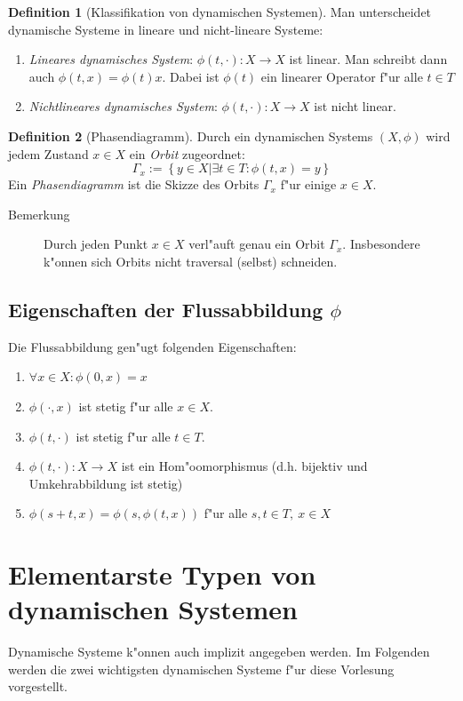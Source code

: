 \documentclass[a4paper, 13pt]{scrreprt}
\theoremstyle{definition} \newtheorem{definition}{Definition}[section]
\begin{document}
\begin{definition}[Klassifikation von dynamischen Systemen]
Man unterscheidet dynamische Systeme in lineare und nicht-lineare Systeme:
\begin{enumerate}
\item \emph{Lineares dynamisches System}: $\phi(t, \cdot)\colon X \to X$ ist linear. Man schreibt dann auch $\phi(t, x) = \phi(t)x$. Dabei ist $\phi(t)$ ein linearer Operator f"ur alle $t\in T$
\item \emph{Nichtlineares dynamisches System}: $\phi(t, \cdot)\colon X \to X$ ist nicht linear.
\end{enumerate}
\end{definition}
\begin{definition}[Phasendiagramm]
Durch ein dynamischen Systems $(X,\phi)$ wird jedem Zustand $x\in X$ ein \emph{Orbit} zugeordnet:
$$\Gamma_x := \left \{\left. y \in X \right | \exists t\in T: \phi(t,x) = y\right \}$$ 
Ein \emph{Phasendiagramm} ist die Skizze des Orbits $\Gamma_x$ f"ur einige $x \in X$.
\begin{description}
\item[Bemerkung]Durch jeden Punkt $x\in X$ verl"auft genau ein Orbit $\Gamma_x$. Insbesondere k"onnen sich Orbits nicht traversal (selbst) schneiden.
\end{description}
\end{definition}
\subsection{Eigenschaften der Flussabbildung $\phi$}
Die Flussabbildung gen"ugt folgenden Eigenschaften:
\begin{enumerate}
\item $\forall x\in X: \phi(0,x) = x$
\item $\phi(\cdot, x)$ ist stetig f"ur alle $x\in X$.
\item $\phi(t, \cdot)$ ist stetig f"ur alle $t\in T$.
\item $\phi(t, \cdot)\colon X \to X$ ist ein Hom"oomorphismus (d.h. bijektiv und Umkehrabbildung ist stetig)
\item $\phi(s+t, x) = \phi\left(s, \phi(t,x)\right)$ f"ur alle $s,t \in T,\  x\in X$
\end{enumerate}

\section{Elementarste Typen von dynamischen Systemen}
Dynamische Systeme k"onnen auch implizit angegeben werden. Im Folgenden werden die zwei wichtigsten dynamischen Systeme f"ur diese Vorlesung vorgestellt.
\end{document}
